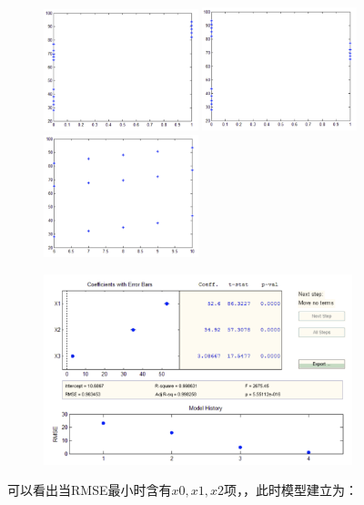 \documentclass{article}
\begin{document}
\begin{figure}[H]
    \centering
    \includegraphics[width=0.4\textwidth]{pic15.png}
    \includegraphics[width=0.4\textwidth]{pic16.png}
    \includegraphics[width=0.4\textwidth]{pic17.png}
\end{figure}

\begin{figure}[H]
    \centering
    \includegraphics[width=0.8\textwidth]{pic18.png}
\end{figure}

可以看出当RMSE最小时含有$x0,x1,x2$项，，此时模型建立为：
\end{document}
